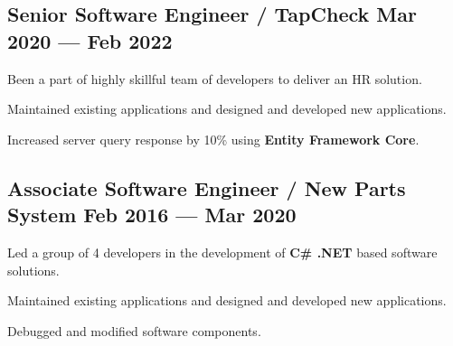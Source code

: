 \documentclass[letter,10pt]{article}
\begin{document}
\subsection{{Senior Software Engineer / TapCheck \hfill Mar 2020 --- Feb 2022}}
\begin{zitemize}
\item Been a part of highly skillful team of developers to deliver an HR solution.
\item Maintained existing applications and designed and developed new applications.
\item Increased server query response by 10\% using \textbf{{Entity Framework Core}}.

\end{zitemize}

\subsection{{Associate Software Engineer / New Parts System \hfill Feb 2016 --- Mar 2020}}
\begin{zitemize}
\item Led a group of 4 developers in the development of \textbf{{C\# .NET}} based software solutions.
\item Maintained existing applications and designed and developed new applications.
\item Debugged and modified software components.

\end{zitemize}

\end{document}

